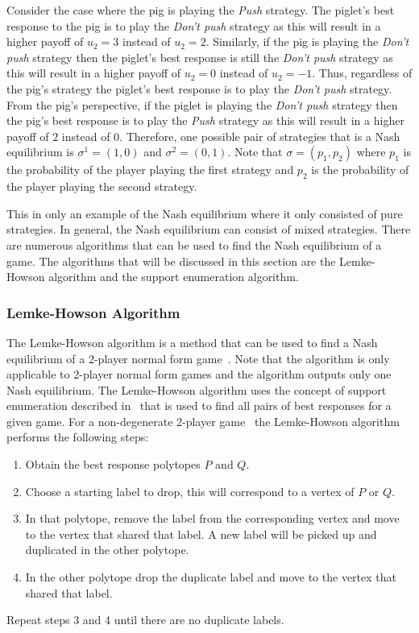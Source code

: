 Consider the case where the pig is playing the \textit{Push} strategy.
The piglet's best response to the pig is to play the \textit{Don't push}
strategy as this will result in a higher payoff of \(u_2=3\) instead of
\(u_2=2\).
Similarly, if the pig is playing the \textit{Don't push} strategy then the
piglet's best response is still the \textit{Don't push} strategy as this will
result in a higher payoff of \(u_2=0\) instead of \(u_2=-1\).
Thus, regardless of the pig's strategy the piglet's best response is to play
the \textit{Don't push} strategy.
From the pig's perspective, if the piglet is playing the \textit{Don't push}
strategy then the pig's best response is to play the \textit{Push} strategy as
this will result in a higher payoff of \(2\) instead of \(0\).
Therefore, one possible pair of strategies that is a Nash equilibrium is
\(\sigma^1 = (1,0)\) and \(\sigma^2 = (0,1)\).
Note that \(\sigma = (p_1, p_2)\) where \(p_1\) is the probability of the player
playing the first strategy and \(p_2\) is the probability of the player
playing the second strategy. 

This in only an example of the Nash equilibrium where it only consisted of pure
strategies.
In general, the Nash equilibrium can consist of mixed strategies.
There are numerous algorithms that can be used to find the Nash equilibrium
of a game.
The algorithms that will be discussed in this section are the Lemke-Howson
algorithm and the support enumeration algorithm.


\subsubsection{Lemke-Howson Algorithm}

The Lemke-Howson algorithm is a method that can be used to find a Nash
equilibrium of a 2-player normal form game~\cite{LemkeHowson}.
Note that the algorithm is only applicable to 2-player normal form games and
the algorithm outputs only one Nash equilibrium.
The Lemke-Howson algorithm uses the concept of support enumeration described
in~\cite{nisan2007}
that is used to find all pairs of best responses for a given game.
For a non-degenerate 2-player game~\cite{degenerategames} the Lemke-Howson
algorithm performs the following steps:

\begin{enumerate}
    \item Obtain the best response polytopes \(P\) and \(Q\).
    \item Choose a starting label to drop, this will correspond to a vertex of
    \(P\) or \(Q\).
    \item In that polytope, remove the label from the corresponding vertex and
    move to the vertex that shared that label.
    A new label will be picked up and duplicated in the other polytope.
    \item In the other polytope drop the duplicate label and move to the vertex
    that shared that label.
\end{enumerate}
Repeat steps 3 and 4 until there are no duplicate labels.

